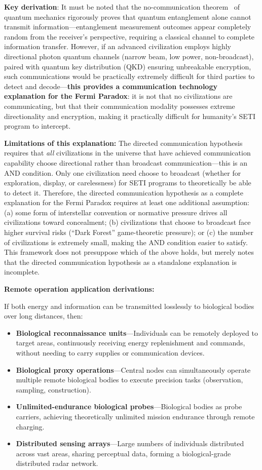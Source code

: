 \documentclass[aps,prd,twocolumn,superscriptaddress,nofootinbib]{revtex4-2}
\begin{document}
\textbf{Key derivation}: It must be noted that the no-communication theorem~\cite{Peres2004} of quantum mechanics rigorously proves that quantum entanglement alone cannot transmit information---entanglement measurement outcomes appear completely random from the receiver's perspective, requiring a classical channel to complete information transfer. However, if an advanced civilization employs highly directional photon quantum channels (narrow beam, low power, non-broadcast), paired with quantum key distribution (QKD) ensuring unbreakable encryption, such communications would be practically extremely difficult for third parties to detect and decode---\textbf{this provides a communication technology explanation for the Fermi Paradox}: it is not that no civilizations are communicating, but that their communication modality possesses extreme directionality and encryption, making it practically difficult for humanity's SETI program to intercept.

\textbf{Limitations of this explanation:} The directed communication hypothesis requires that \emph{all} civilizations in the universe that have achieved communication capability choose directional rather than broadcast communication---this is an AND condition. Only one civilization need choose to broadcast (whether for exploration, display, or carelessness) for SETI programs to theoretically be able to detect it. Therefore, the directed communication hypothesis as a complete explanation for the Fermi Paradox requires at least one additional assumption: (a) some form of interstellar convention or normative pressure drives all civilizations toward concealment; (b) civilizations that choose to broadcast face higher survival risks (``Dark Forest'' game-theoretic pressure); or (c) the number of civilizations is extremely small, making the AND condition easier to satisfy. This framework does not presuppose which of the above holds, but merely notes that the directed communication hypothesis as a standalone explanation is incomplete.

\textbf{Remote operation application derivations:}

If both energy and information can be transmitted losslessly to biological bodies over long distances, then:

\begin{itemize}
  \item \textbf{Biological reconnaissance units}---Individuals can be remotely deployed to target areas, continuously receiving energy replenishment and commands, without needing to carry supplies or communication devices.
  \item \textbf{Biological proxy operations}---Central nodes can simultaneously operate multiple remote biological bodies to execute precision tasks (observation, sampling, construction).
  \item \textbf{Unlimited-endurance biological probes}---Biological bodies as probe carriers, achieving theoretically unlimited mission endurance through remote charging.
  \item \textbf{Distributed sensing arrays}---Large numbers of individuals distributed across vast areas, sharing perceptual data, forming a biological-grade distributed radar network.
\end{itemize}
\end{document}
